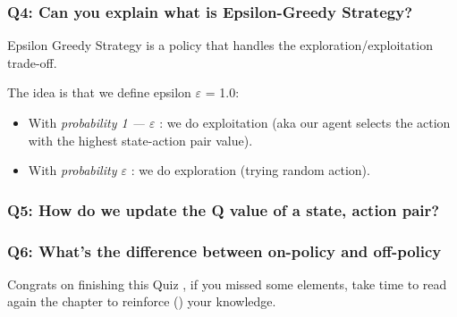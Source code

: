 \documentclass[11pt,a4paper]{article}
\begin{document}
\subsubsection{Q4: Can you explain what is Epsilon-Greedy Strategy?}\label{q4-can-you-explain-what-is-epsilon-greedy-strategy-1}

Epsilon Greedy Strategy is a policy that handles the exploration/exploitation trade-off.

The idea is that we define epsilon \(\varepsilon\) = 1.0:

\begin{itemize}
\tightlist
\item
  With \emph{probability 1 --- \(\varepsilon\)} : we do exploitation (aka our agent selects the action with the highest state-action pair value).
\item
  With \emph{probability \(\varepsilon\)} : we do exploration (trying random action).
\end{itemize}


\subsubsection{Q5: How do we update the Q value of a state, action pair?}\label{q5-how-do-we-update-the-q-value-of-a-state-action-pair-1}


\subsubsection{Q6: What's the difference between on-policy and off-policy}\label{q6-whats-the-difference-between-on-policy-and-off-policy-1}


Congrats on finishing this Quiz , if you missed some elements, take time to read again the chapter to reinforce () your knowledge.
\end{document}
